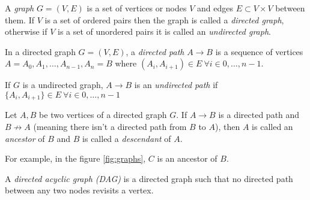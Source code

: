 
\begin{definition}
A \emph{graph} \(G = (V,E)\) is a set of vertices or nodes \(V\) and edges \(E\subset
V\times V\) between them.
If \(V\) is a set of ordered pairs then the graph is called a \emph{directed
  graph}, otherwise if \(V\) is a set of unordered pairs it is called an \emph{undirected graph}.
\end{definition}

\begin{figure*}[h]
\centering
{}
\caption{Example of directed and undirected graph, respectively.}
\label{fig:graphs}
\end{figure*}

\begin{definition}
In a directed graph \(G = (V, E)\), a \emph{directed path} \(A \to B\) is a sequence of vertices \({A = A_0,
  A_1,\dots,A_{n-1}, A_n = B}\) where \((A_i, A_{i+1}) \in E \ \forall i \in
0,\dots ,n-1\).

If \(G\) is a undirected graph, \(A \to B\) is an \emph{undirected path} if \(\{A_i, A_{i+1}\} \in E \ \forall i \in
0,\dots, n-1\)
\end{definition}

\begin{definition}
Let \(A,B\) be two vertices of a directed graph \(G\). If \(A \to B\) is a
directed path and \(B \not \to A\) (meaning there isn't a directed path from
\(B\) to \(A\)), then \(A\) is called an \emph{ancestor} of \(B\) and \(B\) is called a \emph{descendant} of \(A\).
\end{definition}

For example, in the figure \ref{fig:graphs}, \(C\) is an ancestor of \(B\).

\begin{definition}
A \emph{directed acyclic graph (DAG)} is a directed graph such that no directed path between any two nodes revisits a vertex.
\end{definition}


